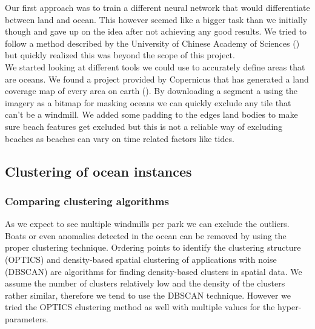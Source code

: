 Our first approach was to train a different neural network that would differentiate between land and ocean. This however seemed like a bigger task than we initially though and gave up on the idea after not achieving any good results. We tried to follow a method described by the University of Chinese Academy of Sciences (\cite{rs10122053}) but quickly realized this was beyond the scope of this project.\\

We started looking at different tools we could use to accurately define areas that are oceans. We found a project provided by Copernicus that has generated a land coverage map of every area on earth (\cite{copernicus}). By downloading a segment a using the imagery as a bitmap for masking oceans we can quickly exclude any tile that can't be a windmill. We added some padding to the edges land bodies to make sure beach features get excluded but this is not a reliable way of excluding beaches as beaches can vary on time related factors like tides.

\subsection{Clustering of ocean instances}

\subsubsection{Comparing clustering algorithms}

As we expect to see multiple windmills per park we can exclude the outliers. Boats or even anomalies detected in the ocean can be removed by using the proper clustering technique. Ordering points to identify the clustering structure (OPTICS) and density-based spatial clustering of applications with noise (DBSCAN) are algorithms for finding density-based clusters in spatial data. We assume the number of clusters relatively low and the density of the clusters rather similar, therefore we tend to use the DBSCAN technique. However we tried the OPTICS clustering method as well with multiple values for the hyper-parameters. 


